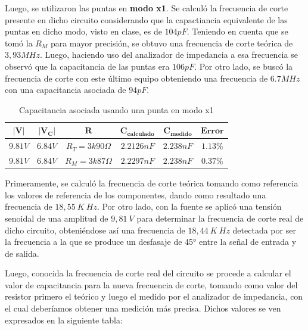 \documentclass[11pt, a4paper]{article}
\begin{document}
Luego, se utilizaron las puntas en \textbf{modo x1}. Se calculó la frecuencia de corte presente en dicho circuito considerando que la capactiancia equivalente de las puntas en dicho modo, visto en clase, es de $104pF$. Teniendo en cuenta que se tomó la $R_M$ para mayor precisión, se obtuvo una frecuencia de corte teórica de $3,93MHz$. Luego, haciendo uso del analizador de impedancia a esa frecuencia se observó que la capacitancia de las puntas era $106pF$. Por otro lado, se buscó la frecuencia de corte con este último equipo obteniendo una frecuencia de $6.7MHz$ con una capacitancia asociada de $94pF$.
 \begin{center}
     \begin{table}[ht]
     \centering
	 \renewcommand{\arraystretch}{1.1}
         \begin{tabular}{c c c c c c}
            \hline 
            $\bm{|V|}$ &  $\bm{|V_C|}$ & $\bm{R}$ &  $\bm{C_{calculado}}$ &    $\bm{C_{medido}}$   &  $\bm{Error}$\\ \hline
            $9.81V$& $6.84V$ & $R_T = 3k90\Omega$  & $2.2126nF$ & $2.238nF$ & $1.13\%$ \\  
            $9.81V$& $6.84V$ & $R_M = 3k87\Omega$ & $2.2297nF$ & $2.238nF$ & $0.37 \%$ \\   \hline
        \end{tabular}
        \caption{Capacitancia asociada usando una punta en modo x1}
        \label{table:valores_punta_x1}
    \end{table}
\end{center}

Primeramente, se calculó la frecuencia de corte teórica tomando como referencia los valores de referencia de los componentes, dando como resultado una frecuencia de $18,55 \ K\ Hz$. Por otro lado, con la fuente se aplicó una tensión senoidal de una amplitud de $9,81 \ V$ para determinar la frecuencia de corte real de dicho circuito, obteniéndose así una frecuencia de $18,44 \ K\ Hz$ detectada por ser la frecuencia a la que se produce un desfasaje de 45° entre la señal de entrada y de salida. \par Luego, conocida la frecuencia de corte real del circuito se procede a calcular el valor de capacitancia para la nueva frecuencia de corte, tomando como valor del resistor primero el teórico y luego el medido por el analizador de impedancia, con el cual deberíamos obtener una medición más precisa. Dichos valores se ven expresados en la siguiente tabla:
\end{document}
